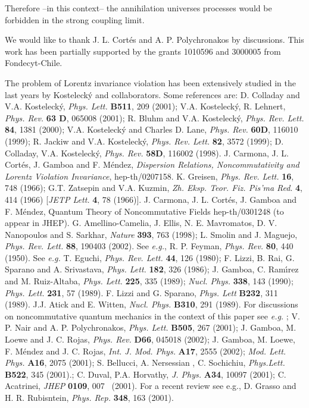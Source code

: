 \documentclass[a4paper,aps,twocolumn,amsfonts]{revtex4}
\begin{document}
Therefore --in this context-- the annihilation universes processes would be forbidden in the strong coupling limit. 

\acknowledgments 
We would like to thank  J. L. Cort\'es and A. P. Polychronakos by discussions. This work has been partially supported by the grants 1010596 and 3000005 from Fondecyt-Chile.




 \begin{references}
  The problem of Lorentz  invariance violation has been  extensively studied in the last years by Kosteleck\'y and collaborators. Some references are:   D. Colladay and V.A. Kosteleck\'y,  {\it Phys. Lett.} {\bf B511}, 209 (2001);  V.A. Kosteleck\'y, R. Lehnert, {\it Phys. Rev.}
 {\bf 63 D}, 065008 (2001);  R. Bluhm and  V.A. Kosteleck\'y, {\it Phys. Rev. Lett.} {\bf 84}, 1381 (2000); V.A. Kosteleck\'y and  Charles D. Lane, 
 {\it Phys. Rev.} {\bf 60D}, 116010 (1999); R. Jackiw and V.A. Kosteleck\'y, {\it Phys. Rev. Lett.} {\bf 82}, 3572 (1999);  D. Colladay, V.A.  Kosteleck\'y, {\it  Phys. Rev.}   {\bf 58D}, 116002 (1998).
 J. Carmona, J. L. Cort\'es, J. Gamboa and F. M\'endez, {\it Dispersion Relations, Noncommutativity and Lorentz Violation Invariance},  hep-th/0207158.
K. Greisen, {\it Phys. Rev. Lett.} {\bf 16}, 748 (1966); G.T. Zatsepin and V.A. Kuzmin, {\it  Zh. Eksp. Teor. Fiz. Pis'ma Red}. {\bf 4}, 414 (1966) [{\it JETP Lett.} {\bf 4}, 78 (1966)].
 J. Carmona, J. L. Cort\'es, J. Gamboa and F. M\'endez, {Quantum Theory of Noncommutative Fields} hep-th/0301248 (to appear in JHEP).  
 G. Amellino-Camelia, J. Ellis, N. E. Mavromatos, D. V.  Nanopoulos and S. Sarkhar, {\it Nature} {\bf393}, 763 (1998); L. Smolin and J. Maguejo, {\it Phys. Rev. Lett.} {\bf 88}, 190403 (2002).
 See {\it e.g.}, R. P. Feyman, {\it Phys. Rev.}  {\bf 80}, 440 (1950).
 See {\it e.g.} T. Eguchi, {\it Phys. Rev. Lett.}  {\bf 44}, 126 (1980); F. Lizzi, B. Rai, G. Sparano and A. Srivastava, 
{\it Phys. Lett. } {\bf 182}, 326 (1986);  J. Gamboa, C. Ram\'{\i}rez and M. Ruiz-Altaba, {\it Phys. Lett.} {\bf 225}, 335 (1989);  {\it Nucl. Phys.} 
{\bf 338}, 143 (1990);  {\it Phys. Lett.} {\bf 231}, 57 (1989).
F. Lizzi and G. Sparano, {\it Phys. Lett} {\bf B232}, 311 (1989).
 J.J. Atick and E. Witten, {\it Nucl. Phys.} {\bf B310}, 291 (1989).
 For discussions on noncommutative quantum mechanics in the context of this paper see {\it e.g.} ;   V. P. Nair and A. P. Polychronakos, {\it Phys. Lett.} {\bf B505}, 267 (2001); J. Gamboa, M. Loewe and J. C. Rojas, {\it Phys. Rev.} {\bf D66}, 045018 (2002);  J. Gamboa, M. Loewe, F. M\'endez  and J. C. Rojas, {\it Int. J. Mod. Phys.} {\bf A17}, 
2555 (2002);  {\it Mod. Lett. Phys.} {\bf A16}, 2075 (2001); S. Bellucci, A.  Nersessian , C. Sochichiu, {\it Phys.Lett.}  {\bf B522}, 345 (2001).; C. Duval, P.A. Horvathy,  {\it J. Phys. } {\bf A34}, 10097 (2001);  C. Acatrinei, {\it JHEP} {\bf 0109}, 007~ (2001).
  For a recent review see {e.g.}, D. Grasso and H. R. Rubisntein, {\it Phys. Rep.} {\bf 348}, 163 (2001).

   
   \end{references}
   
\end{document}
